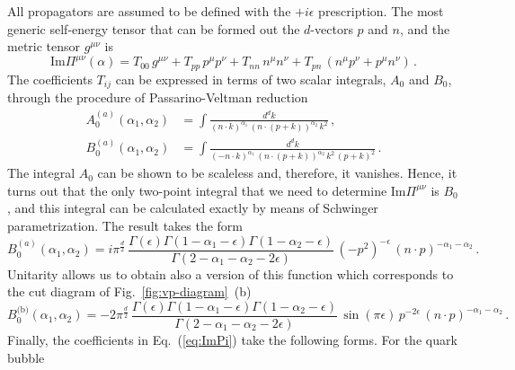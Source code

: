 \documentclass[a4paper,11pt]{article}
\newcommand{\im}{\ensuremath{\text{Im}}\xspace}
\numberwithin{equation}{section}
\begin{document}
All propagators are assumed to be defined with the $+i\epsilon$ prescription.
%
The most generic self-energy tensor that can be formed out the $d$-vectors $p$
and $n$, and the metric tensor $g^{\mu\nu}$ is
%
\begin{equation}
  \im \Pi^{\mu\nu}(\alpha) = 
  T_{00}\, g^{\mu\nu} +
  T_{pp}\, p^{\mu}p^{\nu} +
  T_{nn}\, n^{\mu}n^{\nu} +
  T_{pn}\, \left(n^{\mu} p^{\nu}+p^{\mu} n^{\nu}\right)\,.
  \label{eq:ImPi}
\end{equation}
%
The coefficients $T_{ij}$ can be expressed in terms of two scalar integrals,
$A_0$ and $B_0$, through the procedure of Passarino-Veltman
reduction~\cite{Passarino:1978jh}
%
\begin{align}
  A_0^{(a)}(\alpha_1,\alpha_2) &= 
  \int\frac{d^d k}{(n\cdot k)^{\alpha_1}\, (n\cdot (p+k))^{\alpha_2}\, k^2}\,,
  \\[0.5em]
  B_0^{(a)}(\alpha_1,\alpha_2) &= 
  \int\frac{d^d k}{(-n\cdot k)^{\alpha_1}\, (n\cdot (p+k))^{\alpha_2}\, k^2\,
  (p+k)^2}\,.
\end{align}
%
The integral $A_0$ can be shown to be scaleless and, therefore, it
vanishes. Hence, it turns out that the only two-point integral that we need to
determine $\im \Pi^{\mu\nu}$ is $B_0$, and this integral can be
calculated exactly by means of Schwinger parametrization. The result takes the
form
%
%
\begin{equation}
  B_0^{(a)}(\alpha_1,\alpha_2) = 
  i \pi ^{\frac{d}{2}}\,
  \frac{\Gamma (\epsilon ) \Gamma (1-\alpha_1 -\epsilon )  
        \Gamma (1-\alpha_2 -\epsilon )}
  {\Gamma (2-\alpha_1 -\alpha_2 -2\epsilon)}\,
  \left(-p^2\right)^{-\epsilon }\, (n \cdot p)^{-\alpha_1 - \alpha_2 }\,.
  \label{eq:B0virt}
\end{equation}
%
Unitarity allows us to obtain also a version of this function which
corresponds to the cut diagram of Fig.~\ref{fig:vp-diagram}~(b)
%
%
\begin{equation}
  B_0^\text{(b)}(\alpha_1,\alpha_2) = 
  -2 \pi ^{\frac{d}{2}}\,
  \frac{\Gamma (\epsilon ) \Gamma (1-\alpha_1 -\epsilon )  
        \Gamma (1-\alpha_2 -\epsilon )}
  {\Gamma (2-\alpha_1 -\alpha_2 -2\epsilon)}\,
  \sin (\pi  \epsilon )\,
  p^{-2 \epsilon }\, (n \cdot p)^{-\alpha_1 - \alpha_2 }\,.
  \label{eq:B0real}
\end{equation}
%
Finally, the coefficients in Eq.~(\ref{eq:ImPi}) take the following forms. For
the quark bubble
%
\end{document}
